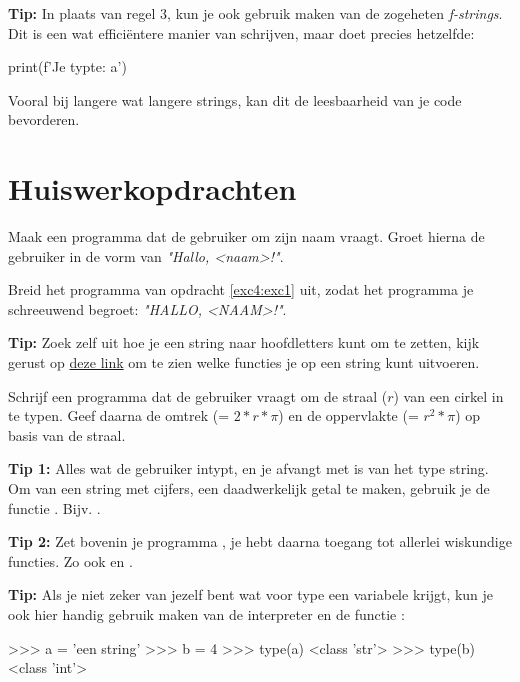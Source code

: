 \begin{remark}
\textbf{Tip:} In plaats van regel $3$, kun je ook gebruik maken van de zogeheten \textit{f-strings}. Dit is een wat efficiëntere manier van schrijven, maar doet precies hetzelfde: 
\begin{python}
print(f'Je typte: {a}')
\end{python}
Vooral bij langere wat langere strings, kan dit de leesbaarheid van je code bevorderen.
\end{remark}

\newpage 

\section{Huiswerkopdrachten}
\vspace{2mm} 
\begin{exercise} \label{exc4:exc1}
Maak een programma dat de gebruiker om zijn naam vraagt. Groet hierna de gebruiker in de vorm van \textit{"Hallo, <naam>!"}.
\end{exercise}

\begin{exercise}
Breid het programma van opdracht \ref{exc4:exc1} uit, zodat het programma je schreeuwend begroet: \textit{"HALLO, <NAAM>!"}. 

\textbf{Tip:} Zoek zelf uit hoe je een string naar hoofdletters kunt om te zetten, kijk gerust op \href{https://www.w3schools.com/python/python_ref_string.asp}{deze link} om te zien welke functies je op een string kunt uitvoeren.
\end{exercise}

\begin{exercise}
Schrijf een programma dat de gebruiker vraagt om de straal ($r$) van een cirkel in te typen. Geef daarna de omtrek (= $2*r*\pi$) en de oppervlakte (= $r^2*\pi$) op basis van de straal. 

\textbf{Tip 1:} Alles wat de gebruiker intypt, en je afvangt met  is van het type string. Om van een string met cijfers, een daadwerkelijk getal te maken, gebruik je de functie . Bijv. .

\textbf{Tip 2:} Zet bovenin je programma , je hebt daarna toegang tot allerlei wiskundige functies. Zo ook  en .
\end{exercise}

\begin{remark}
\textbf{Tip:} Als je niet zeker van jezelf bent wat voor type een variabele krijgt, kun je ook hier handig gebruik maken van de interpreter en de functie :
\begin{python}
>>> a = 'een string'
>>> b = 4
>>> type(a)
<class 'str'>
>>> type(b)
<class 'int'>
\end{python}
\end{remark}

